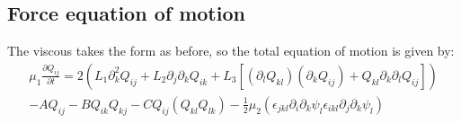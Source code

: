 \documentclass[reqno]{article}
\begin{document}
	\subsection{Force equation of motion}
	The viscous takes the form as before, so the total equation of motion is given by:
	\begin{multline}
		\mu_1 \frac{\partial Q_{ij}}{\partial t}
		= 2 \left(
		L_1 \partial_k^2 Q_{ij}
		+ L_2 \partial_j \partial_k Q_{ik}
		+ L_3 \left[
		\left( \partial_l Q_{kl} \right)
		\left( \partial_k Q_{ij} \right)
		+ Q_{kl} \partial_k \partial_l Q_{ij}
		\right]
		\right) \\
		- A Q_{ij} 
		- B Q_{ik}Q_{kj} 
		- C Q_{ij} (Q_{kl}Q_{lk}) 
		- \tfrac12 \mu_2 \left(
		\epsilon_{jkl} \partial_i \partial_k \psi_l
		\epsilon_{ikl} \partial_j \partial_k \psi_l
		\right)
	\end{multline}
	
\end{document}
